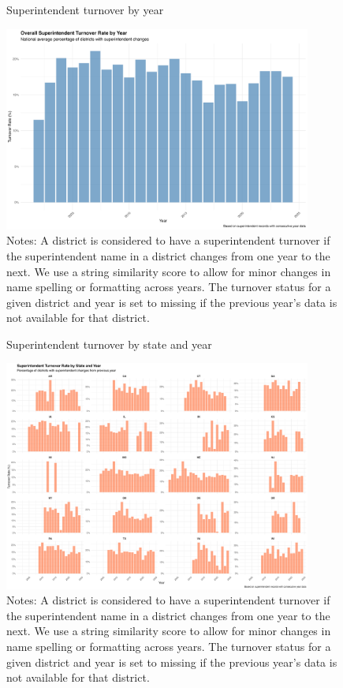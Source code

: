 \documentclass[12pt]{article}
\begin{document}
\begin{figure}[H]
    \caption{Superintendent turnover by year}
    \label{fig:superintendent_turnover_overall}
    \centering
    \includegraphics[width=0.9\textwidth]{figures/superintendent_turnover_overall.png}
    \caption*{\footnotesize Notes: A district is considered to have a superintendent turnover if the superintendent name in a district changes from one year to the next. We use a string similarity score to allow for minor changes in name spelling or formatting across years. The turnover status for a given district and year is set to missing if the previous year's data is not available for that district. }
\end{figure}

\begin{figure}[H]
    \caption{Superintendent turnover by state and year}
    \label{fig:superintendent_turnover_by_state_year}
    \centering
    \includegraphics[width=0.9\textwidth]{figures/superintendent_turnover_by_state_year.png}
    \caption*{\footnotesize Notes: A district is considered to have a superintendent turnover if the superintendent name in a district changes from one year to the next. We use a string similarity score to allow for minor changes in name spelling or formatting across years. The turnover status for a given district and year is set to missing if the previous year's data is not available for that district. }
\end{figure}
\end{document}
